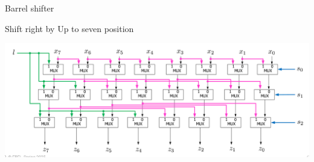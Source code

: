 \begin{parag}{Barrel shifter}
\begin{subparag}{Shift right by Up to seven position}
\begin{center}
        \includegraphics[scale=0.3]{32025-03-17.png}
    \end{center}
\end{subparag}
\end{parag}


















